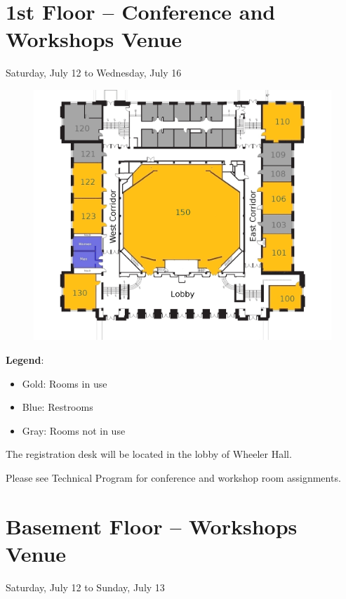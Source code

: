 \newpage
{} \section{1st Floor -- Conference and Workshops Venue}
{\large Saturday, July 12 to Wednesday, July 16}
\begin{figure}[h!]
\center
\includegraphics[height=0.6\textheight]{local_img/maps/first_floor_edited}
\end{figure}

\vspace{0.3cm}

{\Large \textbf{Legend}: 
\begin{itemize}
\itemsep0em 
\item Gold: Rooms in use 
\item Blue: Restrooms
\item Gray: Rooms not in use
\end{itemize}
}

\vspace{0.3cm}
{\Large The registration desk will be located in the lobby of Wheeler Hall.}

\vspace{0.3cm}
{\Large Please see Technical Program for conference and workshop room assignments.}

\newpage
{} \section{Basement Floor -- Workshops Venue}
{\large Saturday, July 12 to Sunday, July 13}

